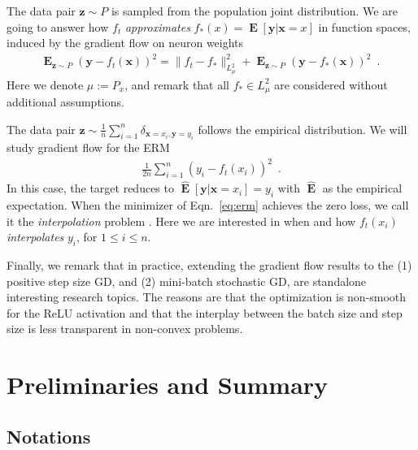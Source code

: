 \documentclass[11pt]{article}
\numberwithin{equation}{section}
\def\E{\mathop{\mathbf{E}}}
\def\bd#1{\mathbf{#1}}
\def\bx{\bd{x}}
\def\by{\bd{y}}
\begin{document}
 The data pair $\bd{z} \sim P$ is sampled from the population joint distribution. We are going to answer
how $f_t$ \textit{approximates} $f_*(x) = \E[\by | \bx = x]$ in function spaces, induced by the gradient flow on neuron weights
\begin{align}
    \label{eq:approx}
    \E_{\bd{z} \sim P} (\by - f_t(\bx))^2 = \| f_t - f_* \|_{L^2_\mu}^2 + \E_{\bd{z} \sim P} (\by - f_*(\bx))^2\enspace.~
\end{align}
Here we denote $\mu:= P_x$, and remark that all $f_* \in L^2_\mu$ are considered without additional assumptions. 

 The data pair $\bd{z} \sim \frac{1}{n} \sum_{i=1}^n \delta_{\bx = x_i, \by = y_i}$ follows the empirical distribution. We will study gradient flow for the ERM
\begin{align}
    \label{eq:erm}
    \frac{1}{2n} \sum_{i=1}^n (y_i - f_t(x_i))^2\enspace.
\end{align}
In this case, the target reduces to $\widehat{\E}[\by|\bx = x_i] = y_i$ with $\widehat{\E}$ as the empirical expectation. When the minimizer of Eqn.~\eqref{eq:erm} achieves the zero loss, we call it the \textit{interpolation} problem \citep{zhang2016understanding, belkin2018understand, ma2017power, liang2018just, rakhlin2018consistency, belkin2018reconciling}.
Here we are interested in when and how $f_t(x_i)$ \textit{interpolates} $y_i$, for $1\leq i \leq n$. 

Finally, we remark that in practice, extending the gradient flow results to the (1) positive step size GD, and (2) mini-batch stochastic GD, are standalone interesting research topics. The reasons are that the optimization is non-smooth for the ReLU activation and that the interplay between the batch size and step size is less transparent in non-convex problems.






\section{Preliminaries and Summary}
\label{sec:pre}


\subsection{Notations}
\end{document}

